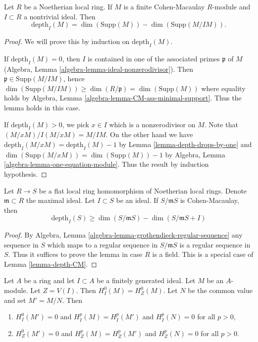 \begin{lemma}
\label{lemma-depth-CM}
Let $R$ be a Noetherian local ring. If $M$ is a finite Cohen-Macaulay
$R$-module and $I \subset R$ a nontrivial ideal. Then
$$
\text{depth}_I(M) = \dim(\text{Supp}(M)) - \dim(\text{Supp}(M/IM)).
$$
\end{lemma}

\begin{proof}
We will prove this by induction on $\text{depth}_I(M)$.

\medskip\noindent
If $\text{depth}_I(M) = 0$, then $I$ is contained in one
of the associated primes $\mathfrak p$ of $M$
(Algebra, Lemma \ref{algebra-lemma-ideal-nonzerodivisor}).
Then $\mathfrak p \in \text{Supp}(M/IM)$, hence
$\dim(\text{Supp}(M/IM)) \geq \dim(R/\mathfrak p) = \dim(\text{Supp}(M))$
where equality holds by
Algebra, Lemma \ref{algebra-lemma-CM-ass-minimal-support}.
Thus the lemma holds in this case.

\medskip\noindent
If $\text{depth}_I(M) > 0$, we pick $x \in I$ which is a
nonzerodivisor on $M$. Note that $(M/xM)/I(M/xM) = M/IM$.
On the other hand we have
$\text{depth}_I(M/xM) = \text{depth}_I(M) - 1$
by Lemma \ref{lemma-depth-drops-by-one}
and $\dim(\text{Supp}(M/xM)) = \dim(\text{Supp}(M)) -  1$
by Algebra, Lemma \ref{algebra-lemma-one-equation-module}.
Thus the result by induction hypothesis.
\end{proof}

\begin{lemma}
\label{lemma-depth-flat-CM}
Let $R \to S$ be a flat local ring homomorphism of Noetherian local
rings. Denote $\mathfrak m \subset R$ the maximal ideal.
Let $I \subset S$ be an ideal.
If $S/\mathfrak mS$ is Cohen-Macaulay, then
$$
\text{depth}_I(S) \geq \dim(S/\mathfrak mS) - \dim(S/\mathfrak mS + I)
$$
\end{lemma}

\begin{proof}
By Algebra, Lemma \ref{algebra-lemma-grothendieck-regular-sequence}
any sequence in $S$ which maps to a regular sequence in $S/\mathfrak mS$
is a regular sequence in $S$. Thus it suffices to prove the lemma
in case $R$ is a field. This is a special case of Lemma \ref{lemma-depth-CM}.
\end{proof}

\begin{lemma}
\label{lemma-divide-by-torsion}
Let $A$ be a ring and let $I \subset A$ be a finitely generated ideal.
Let $M$ be an $A$-module. Let $Z = V(I)$.
Then $H^0_I(M) = H^0_Z(M)$. Let $N$ be the common value and
set $M' = M/N$. Then
\begin{enumerate}
\item $H^0_I(M') = 0$ and $H^p_I(M) = H^p_I(M')$ and $H^p_I(N) = 0$
for all $p > 0$,
\item $H^0_Z(M') = 0$ and $H^p_Z(M) = H^p_Z(M')$ and $H^p_Z(N) = 0$
for all $p > 0$.
\end{enumerate}
\end{lemma}

